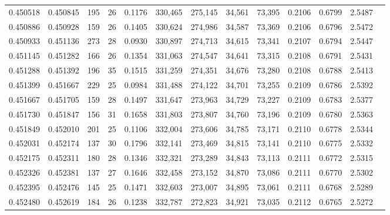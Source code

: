 \begin{tabular}{rrrrrrrrrrrrr}
0.450518 & 0.450845 &    195 &    26 &                                     0.1176 & 330,465 & 275,145 &  34,561 &  73,395 & 0.2106 & 0.6799 & 2.5487 \\
0.450886 & 0.450928 &    159 &    26 &                                     0.1405 & 330,624 & 274,986 &  34,587 &  73,369 & 0.2106 & 0.6796 & 2.5472 \\
0.450933 & 0.451136 &    273 &    28 &                                     0.0930 & 330,897 & 274,713 &  34,615 &  73,341 & 0.2107 & 0.6794 & 2.5447 \\
0.451145 & 0.451282 &    166 &    26 &                                     0.1354 & 331,063 & 274,547 &  34,641 &  73,315 & 0.2108 & 0.6791 & 2.5431 \\
0.451288 & 0.451392 &    196 &    35 &                                     0.1515 & 331,259 & 274,351 &  34,676 &  73,280 & 0.2108 & 0.6788 & 2.5413 \\
0.451399 & 0.451667 &    229 &    25 &                                     0.0984 & 331,488 & 274,122 &  34,701 &  73,255 & 0.2109 & 0.6786 & 2.5392 \\
0.451667 & 0.451705 &    159 &    28 &                                     0.1497 & 331,647 & 273,963 &  34,729 &  73,227 & 0.2109 & 0.6783 & 2.5377 \\
0.451730 & 0.451847 &    156 &    31 &                                     0.1658 & 331,803 & 273,807 &  34,760 &  73,196 & 0.2109 & 0.6780 & 2.5363 \\
0.451849 & 0.452010 &    201 &    25 &                                     0.1106 & 332,004 & 273,606 &  34,785 &  73,171 & 0.2110 & 0.6778 & 2.5344 \\
0.452031 & 0.452174 &    137 &    30 &                                     0.1796 & 332,141 & 273,469 &  34,815 &  73,141 & 0.2110 & 0.6775 & 2.5332 \\
0.452175 & 0.452311 &    180 &    28 &                                     0.1346 & 332,321 & 273,289 &  34,843 &  73,113 & 0.2111 & 0.6772 & 2.5315 \\
0.452326 & 0.452381 &    137 &    27 &                                     0.1646 & 332,458 & 273,152 &  34,870 &  73,086 & 0.2111 & 0.6770 & 2.5302 \\
0.452395 & 0.452476 &    145 &    25 &                                     0.1471 & 332,603 & 273,007 &  34,895 &  73,061 & 0.2111 & 0.6768 & 2.5289 \\
0.452480 & 0.452619 &    184 &    26 &                                     0.1238 & 332,787 & 272,823 &  34,921 &  73,035 & 0.2112 & 0.6765 & 2.5272 \\

\end{tabular}

